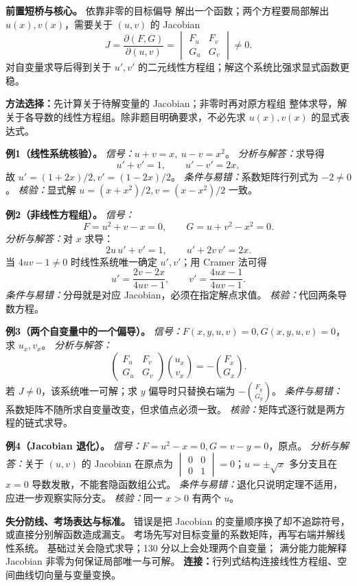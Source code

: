 
\begin{knowledgeBox}
\textbf{前置短桥与核心。}
依靠非零的目标偏导
解出一个函数；两个方程要局部解出
\(u(x),v(x)\)，需要关于 \((u,v)\) 的 Jacobian
\[
J=\frac{\partial(F,G)}{\partial(u,v)}
=\begin{vmatrix}F_u&F_v\\G_u&G_v\end{vmatrix}\ne0.
\]
对自变量求导后得到关于 \(u',v'\) 的二元线性方程组；解这个系统比强求显式函数更稳。

\textbf{方法选择：}先计算关于待解变量的 Jacobian；非零时再对原方程组
整体求导，解关于各导数的线性方程组。除非题目明确要求，不必先求
\(u(x),v(x)\) 的显式表达式。

\textbf{例1（线性系统核验）。}
\emph{信号：}\(u+v=x,\ u-v=x^2\)。
\emph{分析与解答：}求导得
\[
u'+v'=1,\qquad u'-v'=2x,
\]
故 \(u'=(1+2x)/2,v'=(1-2x)/2\)。
\emph{条件与易错：}系数矩阵行列式为 \(-2\ne0\)。
\emph{核验：}显式解 \(u=(x+x^2)/2,v=(x-x^2)/2\) 一致。

\textbf{例2（非线性方程组）。}
\emph{信号：}
\[
F=u^2+v-x=0,\qquad G=u+v^2-x^2=0.
\]
\emph{分析与解答：}对 \(x\) 求导：
\[
2u\,u'+v'=1,\qquad u'+2v\,v'=2x.
\]
当 \(4uv-1\ne0\) 时线性系统唯一确定 \(u',v'\)；用 Cramer 法可得
\[
u'=\frac{2v-2x}{4uv-1},\qquad
v'=\frac{4ux-1}{4uv-1}.
\]
\emph{条件与易错：}分母就是对应 Jacobian，必须在指定解点求值。
\emph{核验：}代回两条导数方程。

\textbf{例3（两个自变量中的一个偏导）。}
\emph{信号：}\(F(x,y,u,v)=0,G(x,y,u,v)=0\)，求 \(u_x,v_x\)。
\emph{分析与解答：}
\[
\begin{pmatrix}F_u&F_v\\G_u&G_v\end{pmatrix}
\binom{u_x}{v_x}
=-\binom{F_x}{G_x}.
\]
若 \(J\ne0\)，该系统唯一可解；求 \(y\) 偏导时只替换右端为
\(-\binom{F_y}{G_y}\)。
\emph{条件与易错：}系数矩阵不随所求自变量改变，但求值点必须一致。
\emph{核验：}矩阵式逐行就是两方程的链式求导。

\textbf{例4（Jacobian 退化）。}
\emph{信号：}\(F=u^2-x=0,G=v-y=0\)，原点。
\emph{分析与解答：}关于 \((u,v)\) 的 Jacobian 在原点为
\(\begin{vmatrix}0&0\\0&1\end{vmatrix}=0\)；\(u=\pm\sqrt{x}\) 多分支且在
\(x=0\) 导数发散，不能套隐函数组公式。
\emph{条件与易错：}退化只说明定理不适用，应进一步观察实际分支。
\emph{核验：}同一 \(x>0\) 有两个 \(u\)。

\textbf{失分防线、考场表达与标准。}
错误是把 Jacobian 的变量顺序换了却不追踪符号，或直接分别解函数造成漏支。
考场先写对目标变量的系数矩阵，再写右端并解线性系统。
基础过关会隐式求导；130 分以上会处理两个自变量；
满分能力能解释 Jacobian 非零为何保证局部唯一与可解。
\textbf{连接：}行列式结构连接线性方程组、空间曲线切向量与变量变换。
\end{knowledgeBox}

